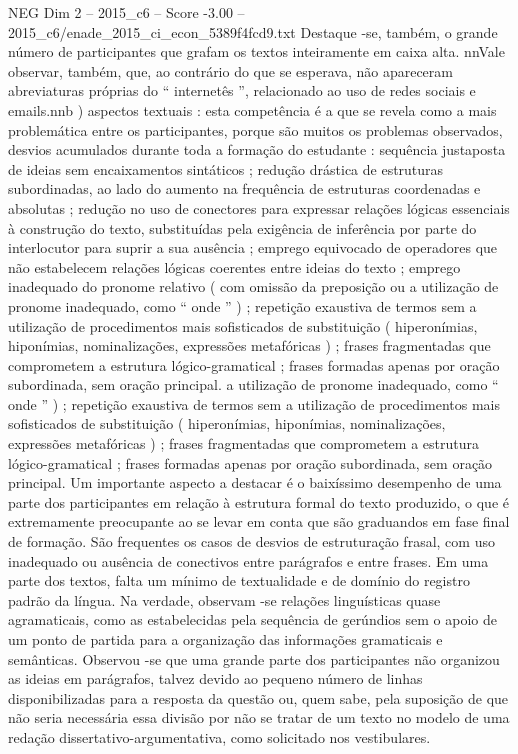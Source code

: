\begin{textsample}{NEG Dim 2 – 2015\_c6 – Score -3.00 – 2015\_c6/enade\_2015\_ci\_econ\_5389f4fcd9.txt}
Destaque -se, também, o grande número de participantes que grafam os textos inteiramente em caixa alta. nnVale observar, também, que, ao contrário do que se esperava, não apareceram abreviaturas próprias do “ internetês ”, relacionado ao uso de redes sociais e emails.nnb ) aspectos textuais : esta competência é a que se revela como a mais problemática entre os participantes, porque são muitos os problemas observados, desvios acumulados durante toda a formação do estudante : sequência justaposta de ideias sem encaixamentos sintáticos ; redução drástica de estruturas subordinadas, ao lado do aumento na frequência de estruturas coordenadas e absolutas ; redução no uso de conectores para expressar relações lógicas essenciais à construção do texto, substituídas pela exigência de inferência por parte do interlocutor para suprir a sua ausência ; emprego equivocado de operadores que não estabelecem relações lógicas coerentes entre ideias do texto ; emprego inadequado do pronome relativo ( com omissão da preposição ou a utilização de pronome inadequado, como “ onde ” ) ; repetição exaustiva de termos sem a utilização de procedimentos mais sofisticados de substituição ( hiperonímias, hiponímias, nominalizações, expressões metafóricas ) ; frases fragmentadas que comprometem a estrutura lógico-gramatical ; frases formadas apenas por oração subordinada, sem oração principal. a utilização de pronome inadequado, como “ onde ” ) ; repetição exaustiva de termos sem a utilização de procedimentos mais sofisticados de substituição ( hiperonímias, hiponímias, nominalizações, expressões metafóricas ) ; frases fragmentadas que comprometem a estrutura lógico-gramatical ; frases formadas apenas por oração subordinada, sem oração principal.
Um importante aspecto a destacar é o baixíssimo desempenho de uma parte dos participantes em relação à estrutura formal do texto produzido, o que é extremamente preocupante ao se levar em conta que são graduandos em fase final de formação.
São frequentes os casos de desvios de estruturação frasal, com uso inadequado ou ausência de conectivos entre parágrafos e entre frases.
Em uma parte dos textos, falta um mínimo de textualidade e de domínio do registro padrão da língua.
Na verdade, observam -se relações linguísticas quase agramaticais, como as estabelecidas pela sequência de gerúndios sem o apoio de um ponto de partida para a organização das informações gramaticais e semânticas.
Observou -se que uma grande parte dos participantes não organizou as ideias em parágrafos, talvez devido ao pequeno número de linhas disponibilizadas para a resposta da questão ou, quem sabe, pela suposição de que não seria necessária essa divisão por não se tratar de um texto no modelo de uma redação dissertativo-argumentativa, como solicitado nos vestibulares.

\end{textsample}
